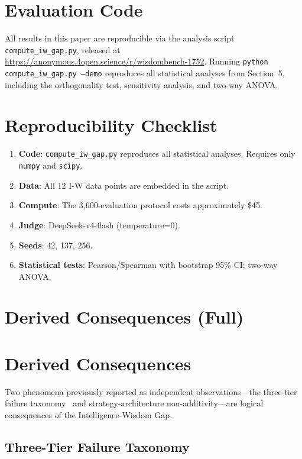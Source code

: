\documentclass{article}
\begin{document}
\appendix


\section{Evaluation Code}
\label{app:code}

All results in this paper are reproducible via the analysis script
\texttt{compute\_iw\_gap.py}, released at \url{https://anonymous.4open.science/r/wisdombench-1752}.
Running \texttt{python compute\_iw\_gap.py --demo} reproduces all statistical analyses from Section~5, including the orthogonality test, sensitivity analysis, and two-way ANOVA.


\section{Reproducibility Checklist}
\label{app:checklist}

\begin{enumerate}[leftmargin=*,itemsep=4pt]
  \item \textbf{Code}: \texttt{compute\_iw\_gap.py} reproduces all
    statistical analyses. Requires only \texttt{numpy} and \texttt{scipy}.
  \item \textbf{Data}: All 12 I-W data points are embedded in the script.
  \item \textbf{Compute}: The 3,600-evaluation protocol costs approximately \$45.
  \item \textbf{Judge}: DeepSeek-v4-flash (temperature=0).
  \item \textbf{Seeds}: 42, 137, 256.
  \item \textbf{Statistical tests}: Pearson/Spearman with bootstrap 95\% CI; two-way ANOVA.
\end{enumerate}


\section{Derived Consequences (Full)}
\label{app:derived}
\section{Derived Consequences}
\label{sec:consequences}

Two phenomena previously reported as independent observations---the
three-tier failure taxonomy~\cite{anon_immunity} and
strategy-architecture non-additivity---are logical consequences of the
Intelligence-Wisdom Gap.

\subsection{Three-Tier Failure Taxonomy}
\end{document}
